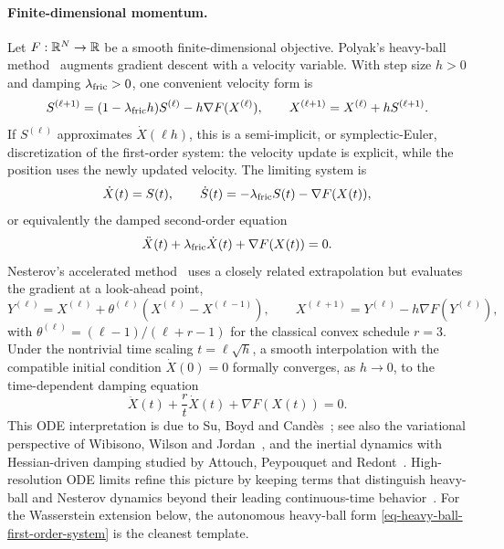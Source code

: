 \paragraph{Finite-dimensional momentum.}
Let $F:\mathbb{R}^{N}\to\mathbb{R}$ be a smooth finite-dimensional objective. Polyak's heavy-ball method~\cite{Polyak1964HeavyBall} augments gradient descent with a velocity variable. With step size $h>0$ and damping $\lambda_{\rm fric}>0$, one convenient velocity form is
\begin{equation}\label{eq-polyak-momentum}
	S^{(\ell+1)}=(1-\lambda_{\rm fric} h)S^{(\ell)}-h\nabla F(X^{(\ell)}),
	\qquad
	X^{(\ell+1)}=X^{(\ell)}+hS^{(\ell+1)}.
\end{equation}
If $S^{(\ell)}$ approximates $\dot X(\ell h)$, this is a semi-implicit, or symplectic-Euler, discretization of the first-order system: the velocity update is explicit, while the position uses the newly updated velocity. The limiting system is
\begin{equation}\label{eq-heavy-ball-first-order-system}
	\dot X(t)=S(t),
	\qquad
	\dot S(t)=-\lambda_{\rm fric} S(t)-\nabla F(X(t)),
\end{equation}
or equivalently the damped second-order equation
\begin{equation}\label{eq-heavy-ball-ode}
	\ddot X(t)+\lambda_{\rm fric}\dot X(t)+\nabla F(X(t))=0.
\end{equation}
Nesterov's accelerated method~\cite{Nesterov1983Accelerated} uses a closely related extrapolation but evaluates the gradient at a look-ahead point,
\begin{equation}\label{eq-nesterov-momentum}
	Y^{(\ell)}=X^{(\ell)}+\theta^{(\ell)}(X^{(\ell)}-X^{(\ell-1)}),
	\qquad
	X^{(\ell+1)}=Y^{(\ell)}-h\nabla F(Y^{(\ell)}),
\end{equation}
with $\theta^{(\ell)}=(\ell-1)/(\ell+r-1)$ for the classical convex schedule $r=3$. Under the nontrivial time scaling \(t=\ell\sqrt h\), a smooth interpolation with the compatible initial condition \(\dot X(0)=0\) formally converges, as \(h\to0\), to the time-dependent damping equation
\begin{equation}\label{eq-nesterov-ode}
	\ddot X(t)+\frac{r}{t}\dot X(t)+\nabla F(X(t))=0.
\end{equation}
This ODE interpretation is due to Su, Boyd and Cand{\`e}s~\cite{SuBoydCandes2016ODE}; see also the variational perspective of Wibisono, Wilson and Jordan~\cite{WibisonoWilsonJordan2016Acceleration}, and the inertial dynamics with Hessian-driven damping studied by Attouch, Peypouquet and Redont~\cite{AttouchPeypouquetRedont2016HessianDamping}. High-resolution ODE limits refine this picture by keeping terms that distinguish heavy-ball and Nesterov dynamics beyond their leading continuous-time behavior~\cite{ShiDuJordanSu2018HighResolution}. For the Wasserstein extension below, the autonomous heavy-ball form \eqref{eq-heavy-ball-first-order-system} is the cleanest template.

